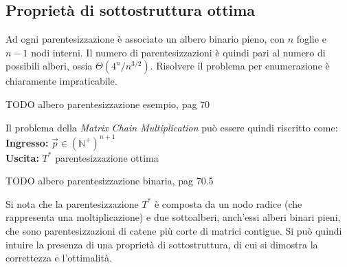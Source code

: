 \subsection{Proprietà di sottostruttura ottima}

Ad ogni parentesizzazione è associato un albero binario pieno, con $n$ foglie e $n-1$ nodi interni. Il numero di parentesizzazioni è quindi pari al numero di possibili alberi, ossia $\Theta \left( 4^n / n^{3/2} \right)$.
Risolvere il problema per enumerazione è chiaramente impraticabile.

TODO albero parentesizzazione esempio, pag 70

Il problema della \emph{Matrix Chain Multiplication} può essere quindi riscritto come:
\\
\textbf{Ingresso:} $ \vec{p} \in \left( \mathbb{N}^+ \right)^{n+1} $
\\
\textbf{Uscita:} $T^*$ parentesizzazione ottima

TODO albero parentesizzazione binaria, pag 70.5

Si nota che la parentesizzazione $T^*$ è composta da un nodo radice (che rappresenta una moltiplicazione) e due sottoalberi, anch'essi alberi binari pieni, che sono parentesizzazioni di catene più corte di matrici contigue. Si può quindi intuire la presenza di una proprietà di sottostruttura, di cui si dimostra la correttezza e l'ottimalità.

